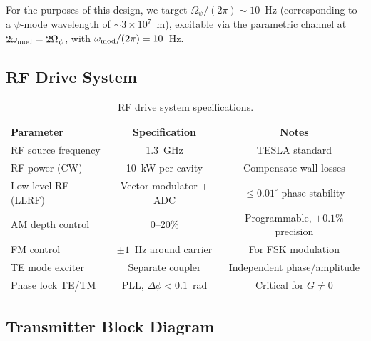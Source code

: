 \documentclass[11pt,onecolumn]{article}
\begin{document}
For the purposes of this design, we target
$\Omega_\psi / (2\pi) \sim 10$~Hz (corresponding to a $\psi$-mode
wavelength of $\sim 3 \times 10^7$~m), excitable via the parametric
channel at $2\omega_{\rm mod} = 2\Omega_\psi$, with $\omega_{\rm mod}/(2\pi) = 10$~Hz.

\subsection{RF Drive System}

\begin{table}[H]
\centering
\caption{RF drive system specifications.}
\label{tab:rf-drive}
\begin{tabular}{lcc}
\toprule
Parameter & Specification & Notes \\
\midrule
RF source frequency & 1.3~GHz & TESLA standard \\
RF power (CW) & 10~kW per cavity & Compensate wall losses \\
Low-level RF (LLRF) & Vector modulator + ADC & $\leq 0.01^\circ$ phase stability \\
AM depth control & 0--20\% & Programmable, $\pm 0.1\%$ precision \\
FM control & $\pm 1$~Hz around carrier & For FSK modulation \\
TE mode exciter & Separate coupler & Independent phase/amplitude \\
Phase lock TE/TM & PLL, $\Delta\phi < 0.1$~rad & Critical for $G \neq 0$ \\
\bottomrule
\end{tabular}
\end{table}

\subsection{Transmitter Block Diagram}
\end{document}
